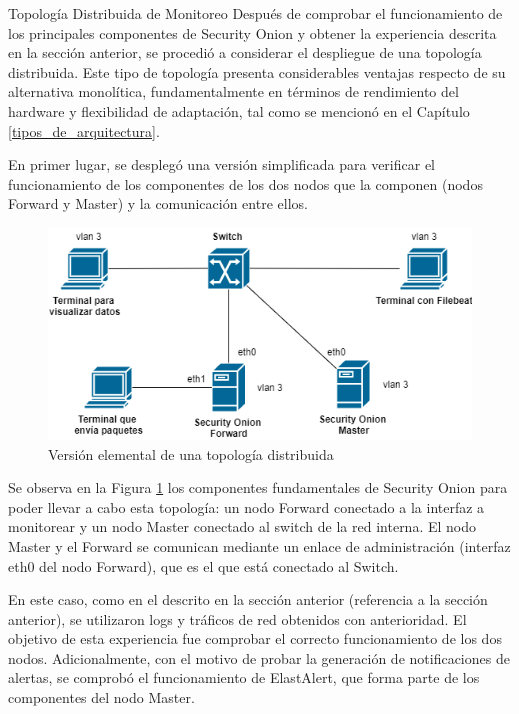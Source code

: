         \begin{subsection}{Topología Distribuida de Monitoreo}
        \label{sec_topo_dist}
            Después de comprobar el funcionamiento de los principales componentes de Security Onion y obtener la experiencia descrita en la sección anterior, se procedió a considerar el despliegue de una topología distribuida. Este tipo de topología presenta considerables ventajas respecto de su alternativa monolítica, fundamentalmente en términos de rendimiento del hardware y flexibilidad de adaptación, tal como se mencionó en el Capítulo  \ref{tipos_de_arquitectura}. \par
            En primer lugar, se desplegó una versión simplificada para verificar el funcionamiento de los componentes de los dos nodos que la componen (nodos Forward y Master) y la comunicación entre ellos.
            \begin{figure}[H]
                \centering
                \includegraphics[width=1\textwidth]{./iteracion_1_imagenes/figura_33_b_topologia_de_prueba_2.png}
                \caption{Versión elemental de una topología distribuida}
                \label{fig:topologia_distribuida_1}
            \end{figure}
            Se observa en la Figura \ref{fig:topologia_distribuida_1} los componentes fundamentales de Security Onion para poder llevar a cabo esta topología: un nodo Forward conectado a la interfaz a monitorear y un nodo Master conectado al switch de la red interna. El nodo Master y el Forward se comunican mediante un enlace de administración (interfaz eth0 del nodo Forward), que es el que está conectado al Switch. \par
            En este caso, como en el descrito en la sección anterior (referencia a la sección anterior), se utilizaron logs y tráficos de red obtenidos con anterioridad. El objetivo de esta experiencia fue comprobar el correcto funcionamiento de los dos nodos. Adicionalmente, con el motivo de probar la generación de notificaciones de alertas, se comprobó el funcionamiento de ElastAlert, que forma parte de los componentes del nodo Master. \par

\end{subsection}
